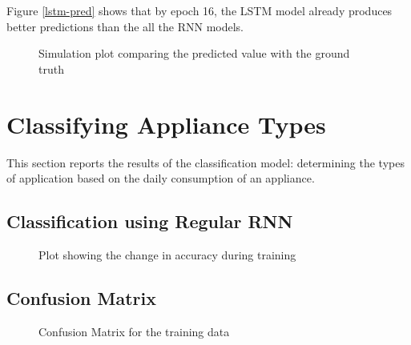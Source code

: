 \documentclass[a4paper, article, oneside, USenglish, IN5460]{memoir}
\begin{document}
Figure \ref{lstm-pred} shows that by epoch 16, the LSTM model already produces better predictions than the all the RNN models.

\begin{figure}[H]
  \centering
    
  \caption{Simulation plot comparing the predicted value with the ground truth}
\end{figure}


\chapter{Classifying Appliance Types}

This section reports the results of the classification model: determining the types of application based on the daily consumption of an appliance.

\section{Classification using Regular RNN}

\begin{figure}[H]
  \centering
    
  \caption{Plot showing the change in accuracy during training}
\end{figure}


\section{Confusion Matrix}

\begin{figure}[H]
  \centering
    
  \caption{Confusion Matrix for the training data}
\end{figure}

\begin{figure}[H]
  \centering
    
\end{figure}
\end{document}
